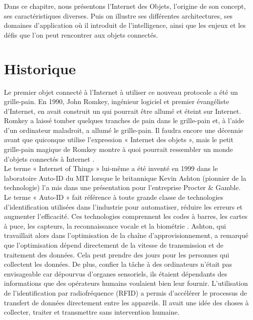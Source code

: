 Dans ce chapitre, nous présentons l’Internet des Objets, l’origine de son concept, ses caractéristiques diverses. Puis on illustre ses dif{\kern0pt}férentes architectures, ses domaines d’application où il introduit de l’intelligence, ainsi que les enjeux et les déf{\kern0pt}is que l’on peut rencontrer aux objets connectés.


\section{Historique}
Le premier \og objet \fg{}  connecté à l’Internet à utiliser ce nouveau protocole a été un grille-pain. En 1990, John Romkey, ingénieur logiciel et premier évangéliste d'Internet, en avait construit un qui pourrait être allumé et éteint sur Internet. Romkey a laissé tomber quelques tranches de pain dans le grille-pain et, à l'aide d'un ordinateur maladroit, a allumé le grille-pain. Il faudra encore une décennie avant que quiconque utilise l'expression « Internet des objets », mais le petit grille-pain magique de Romkey montre à quoi pourrait ressembler un monde d'objets connectés à Internet \cite{pardes2020iot}.\\

Le terme « Internet of Things » lui-même a été inventé en 1999 dans le laboratoire Auto-ID du MIT lorsque le britannique Kevin Ashton (pionnier de la technologie) l'a mis dans une présentation pour l’entreprise Procter \& Gamble. Le terme « Auto-ID » fait référence à toute grande classe de technologies d'identif{\kern0pt}ication utilisées dans l'industrie pour automatiser, réduire les erreurs et augmenter l'ef{\kern0pt}f{\kern0pt}icacité. Ces technologies comprennent les codes à barres, les cartes à puce, les capteurs, la reconnaissance vocale et la biométrie \cite{sundmaeker2010vision}. Ashton, qui travaillait alors dans l'optimisation de la chaîne d'approvisionnement, a remarqué que l'optimisation dépend directement de la vitesse de transmission et de traitement des données. Cela peut prendre des jours pour les personnes qui collectent les données. De plus, conf{\kern0pt}ier la tâche à des ordinateurs n’était pas envisageable car dépourvus d’organes sensoriels, ils étaient dépendants des informations que des opérateurs humains voulaient bien leur fournir. L'utilisation de l'identif{\kern0pt}ication par radiofréquence (RFID) a permis d'accélérer le processus de transfert de données directement entre les appareils. Il avait une idée des choses à collecter, traiter et transmettre sans intervention humaine.\\

